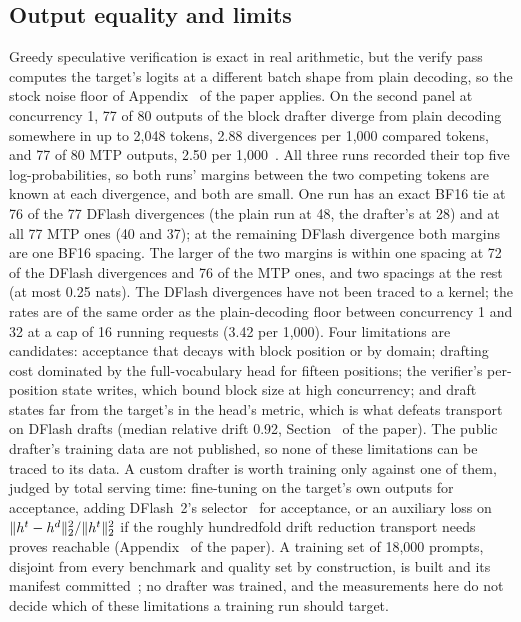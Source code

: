 \subsection{Output equality and limits}\label{app:drafter-limits}\label{sec:drafter-limits}
Greedy speculative verification is exact in real arithmetic, but the verify pass computes the target's logits at a different batch shape from plain decoding, so the stock noise floor of Appendix~ of the paper applies. On the second panel at concurrency 1, 77 of 80 outputs of the block drafter diverge from plain decoding somewhere in up to 2,048 tokens, 2.88 divergences per 1,000 compared tokens, and 77 of 80 MTP outputs, 2.50 per 1,000~. All three runs recorded their top five log-probabilities, so both runs' margins between the two competing tokens are known at each divergence, and both are small. One run has an exact BF16 tie at 76 of the 77 DFlash divergences (the plain run at 48, the drafter's at 28) and at all 77 MTP ones (40 and 37); at the remaining DFlash divergence both margins are one BF16 spacing. The larger of the two margins is within one spacing at 72 of the DFlash divergences and 76 of the MTP ones, and two spacings at the rest (at most 0.25 nats). The DFlash divergences have not been traced to a kernel; the rates are of the same order as the plain-decoding floor between concurrency 1 and 32 at a cap of 16 running requests (3.42 per 1,000). Four limitations are candidates: acceptance that decays with block position or by domain; drafting cost dominated by the full-vocabulary head for fifteen positions; the verifier's per-position state writes, which bound block size at high concurrency; and draft states far from the target's in the head's metric, which is what defeats transport on DFlash drafts (median relative drift 0.92, Section~ of the paper). The public drafter's training data are not published, so none of these limitations can be traced to its data. A custom drafter is worth training only against one of them, judged by total serving time: fine-tuning on the target's own outputs for acceptance, adding DFlash~2's selector~\cite{dflash,dflashcard} for acceptance, or an auxiliary loss on $\lVert h^t-h^d\rVert_2^2/\lVert h^t\rVert_2^2$ if the roughly hundredfold drift reduction transport needs proves reachable (Appendix~ of the paper). A training set of 18,000 prompts, disjoint from every benchmark and quality set by construction, is built and its manifest committed~; no drafter was trained, and the measurements here do not decide which of these limitations a training run should target.

